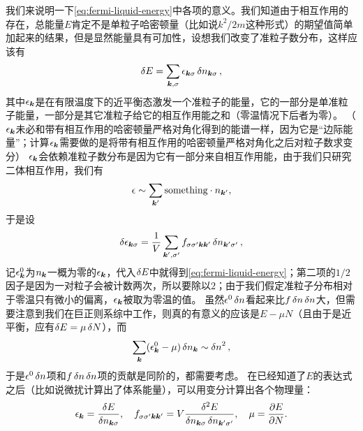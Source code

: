 \documentclass[hyperref, UTF8, a4paper]{ctexart}
\begin{document}
我们来说明一下\eqref{eq:fermi-liquid-energy}中各项的意义。我们知道由于相互作用的存在，总能量$E$肯定不是单粒子哈密顿量（比如说$k^2/2m$这种形式）的期望值简单加起来的结果，但是显然能量具有可加性，设想我们改变了准粒子数分布，这样应该有
\[
    \var{E} = \sum_{\vb*{k}, \sigma} \epsilon_{\vb*{k} \sigma} \var{n_{\vb*{k} \sigma}},
\]
其中$\epsilon_{\vb*{k}}$是在有限温度下的近平衡态激发一个准粒子的能量，它的一部分是单准粒子能量，一部分是其它准粒子给它的相互作用能之和（零温情况下后者为零）。
（$\epsilon_{\vb*{k}}$未必和带有相互作用的哈密顿量严格对角化得到的能谱一样，因为它是“边际能量”；计算$\epsilon_{\vb*{k}}$需要做的是将带有相互作用的哈密顿量严格对角化之后对粒子数求变分）
$\epsilon_{\vb*{k}}$会依赖准粒子数分布是因为它有一部分来自相互作用能，由于我们只研究二体相互作用，我们有
\[
    \epsilon \sim \sum_{\vb*{k}'} \text{something} \cdot n_{\vb*{k}'},
\]
于是设
\[
    \var{\epsilon_{\vb*{k} \sigma}} = \frac{1}{V} \sum_{\vb*{k}', \sigma'} f_{\sigma \sigma' \vb*{k} \vb*{k}'} \var{n_{\vb*{k}' \sigma'}},
\]
记$\epsilon_{\vb*{k}}^0$为$n_{\vb*{k}}$一概为零的$\epsilon_{\vb*{k}}$，代入$\var{E}$中就得到\eqref{eq:fermi-liquid-energy}；第二项的$1/2$因子是因为一对粒子会被计数两次，所以要除以$2$；由于我们假定准粒子分布相对于零温只有微小的偏离，$\epsilon_{\vb*{k}}$被取为零温的值。
虽然$\epsilon^0 \var{n}$看起来比$f\var{n} \var{n}$大，但需要注意到我们在巨正则系综中工作，则真的有意义的应该是$E-\mu N$（且由于是近平衡，应有$\var{E} = \mu \var{N}$），而
\[
    \sum_{\vb*{k}} (\epsilon^0_{\vb*{k}} - \mu) \var{n_{\vb*{k}}} \sim \var{n}^2,
\]
于是$\epsilon^0 \var{n}$项和$f\var{n} \var{n}$项的贡献是同阶的，都需要考虑。
在已经知道了$E$的表达式之后（比如说微扰计算出了体系能量），可以用变分计算出各个物理量：
\begin{equation}
    \epsilon_{\vb*{k}} = \fdv{E}{n_{\vb*{k} \sigma}} , \quad f_{\sigma \sigma' \vb*{k} \vb*{k}'} = V \frac{\var[2]{E}}{\var{n_{\vb*{k} \sigma}}\var{n_{\vb*{k}' \sigma'}}}, \quad \mu = \pdv{E}{N}.
\end{equation}
\end{document}
